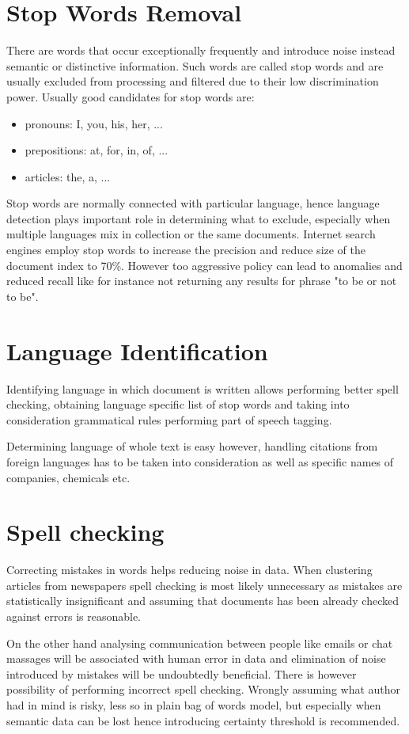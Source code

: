 \documentclass[a4paper, 12pt, oneside]{Thesis} %
\begin{document}
\section{Stop Words Removal} There are words that occur exceptionally frequently and introduce noise instead semantic or distinctive information. Such words are called stop words and are usually excluded from processing and filtered due to their low discrimination power. Usually good candidates for stop words are: 
\begin{itemize}
\item pronouns: I, you, his, her, ...
\item prepositions: at, for, in, of, ...
\item articles: the, a, ...
\end{itemize}
Stop words are normally connected with particular language, hence language detection plays important role in determining what to exclude, especially when multiple languages mix in collection or the same documents. Internet search engines employ stop words to increase the precision and reduce size of the document index to 70\%. However too aggressive policy can lead to anomalies and reduced recall like for instance not returning any results for phrase "to be or not to be".

\section{Language Identification} Identifying language in which document is written allows performing better spell checking, obtaining language specific list of stop words and taking into consideration grammatical rules performing part of speech tagging. 

Determining language of whole text is easy however, handling citations from foreign languages has to be taken into consideration as well as specific names of companies, chemicals etc.

\section{Spell checking} Correcting mistakes in words helps reducing noise in data. When clustering articles from newspapers spell checking is most likely unnecessary as mistakes are statistically insignificant and assuming that documents has been already checked against errors is reasonable. 

On the other hand analysing communication between people like emails or chat massages will be associated with human error in data and elimination of noise introduced by mistakes will be undoubtedly beneficial. There is however possibility of performing incorrect spell checking. Wrongly assuming what author had in mind is risky, less so in plain bag of words model, but especially when semantic data can be lost hence introducing certainty threshold is recommended.
\end{document}

